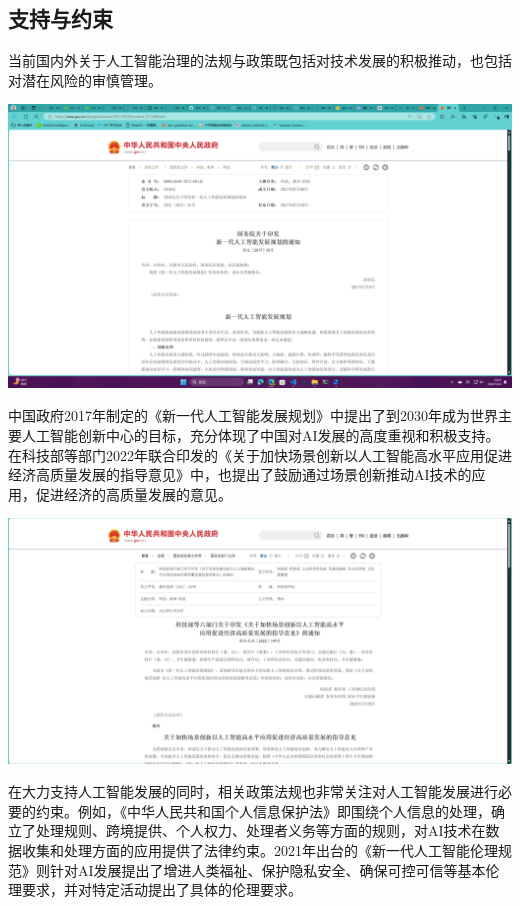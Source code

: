 \subsection{支持与约束}

当前国内外关于人工智能治理的法规与政策既包括对技术发展的积极推动，也包括对潜在风险的审慎管理。

\begin{marginfigure}
\includegraphics{images/policy_1.PNG}
\end{marginfigure}
中国政府2017年制定的《新⼀代⼈⼯智能发展规划》中提出了到2030年成为世界主要人工智能创新中心的目标，充分体现了中国对AI发展的高度重视和积极支持。在科技部等部门2022年联合印发的《关于加快场景创新以人工智能高水平应用促进经济高质量发展的指导意见》中，也提出了鼓励通过场景创新推动AI技术的应用，促进经济的高质量发展的意见。

\begin{marginfigure}
\includegraphics{images/policy_2.PNG}
\end{marginfigure}
在大力支持人工智能发展的同时，相关政策法规也非常关注对人工智能发展进行必要的约束。例如，《中华人民共和国个人信息保护法》即围绕个人信息的处理，确立了处理规则、跨境提供、个人权力、处理者义务等方面的规则，对AI技术在数据收集和处理方面的应用提供了法律约束。2021年出台的《新一代人工智能伦理规范》则针对AI发展提出了增进人类福祉、保护隐私安全、确保可控可信等基本伦理要求，并对特定活动提出了具体的伦理要求。

